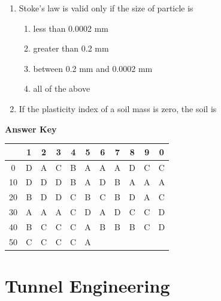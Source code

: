 \documentclass[11pt,a4paper]{article}
\begin{document}
\begin{enumerate}
\item{Stoke's law is valid only if the size of particle is
}
\begin{enumerate}[label=\Alph*.]
\item{less than 0.0002 mm}
\item{greater than 0.2 mm}
\item{between 0.2 mm and 0.0002 mm}
\item{all of the above}
\end{enumerate}
\item{If the plasticity index of a soil mass is zero, the soil is}
\\
\end{enumerate}
\textbf{Answer Key}
\begin{tabular}{ | c | c c c c c c c c c c | }
\hline
 & 1 & 2 & 3 & 4 & 5 & 6 & 7 & 8 & 9 & 0 \\
\hline
0 & D & A & C & B & A & A & A & D & C & C \\
10 & D & D & D & B & A & D & B & A & A & A \\
20 & B & D & D & C & B & C & B & D & A & C \\
30 & A & A & A & C & D & A & D & C & C & D \\
40 & B & C & C & C & A & B & B & B & C & D \\
50 & C & C & C & C & A &   &   &   &   &   \\
\hline
\end{tabular}
\clearpage
\section{Tunnel Engineering}
\end{document}

